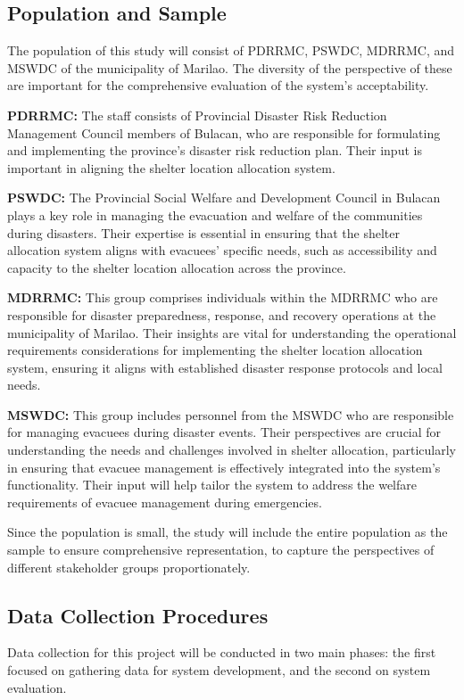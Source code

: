\subsection{Population and Sample}
	The population of this study will consist of PDRRMC, PSWDC, MDRRMC, and MSWDC of the municipality of Marilao. The diversity of the perspective of these are important for the comprehensive evaluation of the system’s acceptability.
	
	\textbf{PDRRMC:} The staff consists of Provincial Disaster Risk Reduction Management Council members of Bulacan, who are responsible for formulating and implementing the province's disaster risk reduction plan. Their input is important in aligning the shelter location allocation system.
	
	\textbf{PSWDC:} The Provincial Social Welfare and Development Council in Bulacan plays a key role in managing the evacuation and welfare of the communities during disasters. Their expertise is essential in ensuring that the shelter allocation system aligns with evacuees' specific needs, such as accessibility and capacity to the shelter location allocation across the province.
	
	\textbf{MDRRMC:} This group comprises individuals within the MDRRMC who are responsible for disaster preparedness, response, and recovery operations at the municipality of Marilao. Their insights are vital for understanding the operational requirements considerations for implementing the shelter location allocation system, ensuring it aligns with established disaster response protocols and local needs.
	
	\textbf{MSWDC:}  This group includes personnel from the MSWDC who are responsible for managing evacuees during disaster events. Their perspectives are crucial for understanding the needs and challenges involved in shelter allocation, particularly in ensuring that evacuee management is effectively integrated into the system’s functionality. Their input will help tailor the system to address the welfare requirements of evacuee management during emergencies.
	
	Since the population is small, the study will include the entire population as the sample to ensure comprehensive representation, to capture the perspectives of different stakeholder groups proportionately.

\subsection{Data Collection Procedures}
	Data collection for this project will be conducted in two main phases: the first focused on gathering data for system development, and the second on system evaluation.
	

